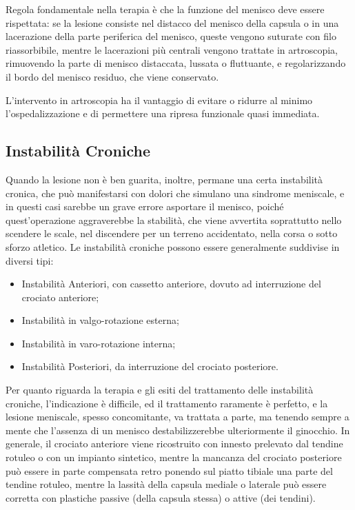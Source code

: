 Regola fondamentale nella terapia è che la funzione del menisco deve essere rispettata: se la lesione consiste nel distacco del menisco della capsula o in una lacerazione della parte periferica del menisco, queste vengono suturate con filo riassorbibile, mentre le lacerazioni più centrali vengono trattate in artroscopia, rimuovendo la parte di menisco distaccata, lussata o fluttuante, e regolarizzando il bordo del menisco residuo, che viene conservato.

L'intervento in artroscopia ha il vantaggio di evitare o ridurre al minimo l'ospedalizzazione e di permettere una ripresa funzionale quasi immediata.

\subsection{Instabilità Croniche}

Quando la lesione non è ben guarita, inoltre, permane una certa instabilità cronica, che può manifestarsi con dolori che simulano una sindrome meniscale, e in questi casi sarebbe un grave errore asportare il menisco, poiché quest'operazione aggraverebbe la stabilità, che viene avvertita soprattutto nello scendere le scale, nel discendere per un terreno accidentato, nella corsa o sotto sforzo atletico. Le instabilità croniche possono essere generalmente suddivise in diversi tipi:

\begin{itemize}
\item
  Instabilità Anteriori, con cassetto anteriore, dovuto ad interruzione del crociato anteriore;
\item
  Instabilità in valgo-rotazione esterna;
\item
  Instabilità in varo-rotazione interna;
\item
  Instabilità Posteriori, da interruzione del crociato posteriore.
\end{itemize}

Per quanto riguarda la terapia e gli esiti del trattamento delle instabilità croniche, l'indicazione è difficile, ed il trattamento raramente è perfetto, e la lesione meniscale, spesso concomitante, va trattata a parte, ma tenendo sempre a mente che l'assenza di un menisco destabilizzerebbe ulteriormente il ginocchio. In generale, il crociato anteriore viene ricostruito con innesto prelevato dal tendine rotuleo o con un impianto sintetico, mentre la mancanza del crociato posteriore può essere in parte compensata retro ponendo sul piatto tibiale una parte del tendine rotuleo, mentre la lassità della capsula mediale o laterale può essere corretta con plastiche passive (della capsula stessa) o attive (dei tendini).
